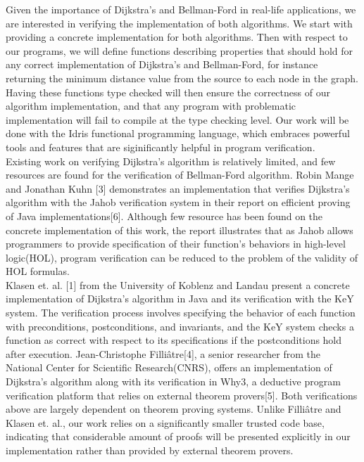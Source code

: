 \documentclass[11pt, a4paper]{article} %
\theoremstyle{definition}
\begin{document}
Given the importance of Dijkstra's and Bellman-Ford in real-life applications, we are interested in verifying the implementation of both algorithms. We start with providing a concrete implementation for both algorithms. Then with respect to our programs, we will define functions describing properties that should hold for any correct implementation of Dijkstra's and Bellman-Ford, for instance returning the minimum distance value from the source to each node in the graph. Having these functions type checked will then ensure the correctness of our algorithm implementation, and that any program with problematic implementation will fail to compile at the type checking level. Our work will be done with the Idris functional programming language, which embraces powerful tools and features that are siginificantly helpful in program verification.
\\

Existing work on verifying Dijkstra's algorithm is relatively limited, and few resources are found for the verification of Bellman-Ford algorithm. Robin Mange and Jonathan Kuhn [3] demonstrates an implementation that verifies Dijkstra's algorithm with the Jahob verification system in their report on efficient proving of Java implementations[6]. Although few resource has been found on the concrete implementation of this work, the report illustrates that as Jahob allows programmers to provide specification of their function's behaviors in high-level logic(HOL), program verification can be reduced to the problem of the validity of HOL formulas. 
\\

Klasen et. al. [1] from the University of Koblenz and Landau present a concrete implementation of Dijkstra's algorithm in Java and its verification with the KeY system. The verification process involves specifying the behavior of each function with preconditions, postconditions, and invariants, and the KeY system checks a function as correct with respect to its specifications if the postconditions hold after execution. Jean-Christophe Filliâtre[4], a senior researcher from the National Center for Scientific Research(CNRS), offers an implementation of Dijkstra's algorithm along with its verification in Why3, a deductive program verification platform that relies on external theorem provers[5]. Both verifications above are largely dependent on theorem proving systems. Unlike Filliâtre and Klasen et. al., our work relies on a significantly smaller trusted code base, indicating that considerable amount of proofs will be presented explicitly in our implementation rather than provided by external theorem provers.
\end{document}
